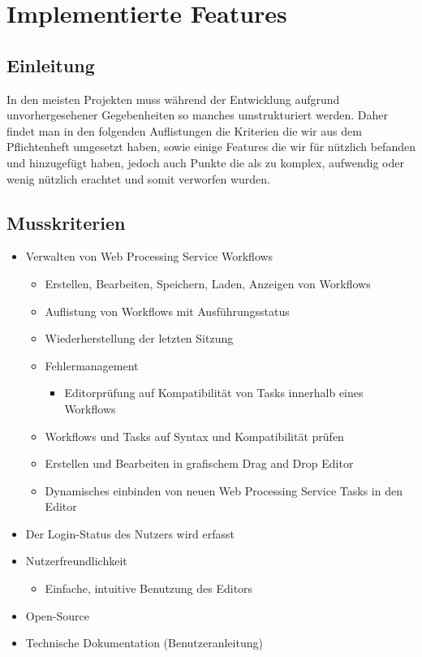 \chapter{Implementierte Features}
    
    \section{Einleitung}
    In den meisten Projekten muss während der Entwicklung aufgrund unvorhergesehener Gegebenheiten so manches umstrukturiert werden. Daher findet man in den folgenden Auflistungen die Kriterien die wir aus dem Pflichtenheft umgesetzt haben, sowie einige Features die wir für nützlich befanden und hinzugefügt haben, jedoch auch Punkte die als zu komplex, aufwendig oder wenig nützlich erachtet und somit verworfen wurden.\newline
    
    \section{Musskriterien}
    
        \begin{itemize}
			\item Verwalten von \gls{Web Processing Service} Workflows
				\begin{itemize}
					\item Erstellen, Bearbeiten, Speichern, Laden, Anzeigen von Workflows
					\item Auflistung von Workflows mit Ausführungsstatus
					\item Wiederherstellung der letzten Sitzung
					\item Fehlermanagement
					    \begin{itemize}
                        	\item Editorprüfung auf Kompatibilität von Tasks innerhalb eines Workflows
                        \end{itemize}
					\item Workflows und \Gls{Task}s auf Syntax und Kompatibilität prüfen
					\item Erstellen und Bearbeiten in grafischem \Gls{Drag and Drop} Editor
					\item Dynamisches einbinden von neuen \gls{Web Processing Service} Tasks in den Editor
				\end{itemize}
			\item Der Login-Status des Nutzers wird erfasst
			\item Nutzerfreundlichkeit
				\begin{itemize}
					\item Einfache, intuitive Benutzung des Editors
				\end{itemize}
			\item Open-Source
			\item Technische Dokumentation (Benutzeranleitung)
		\end{itemize}

